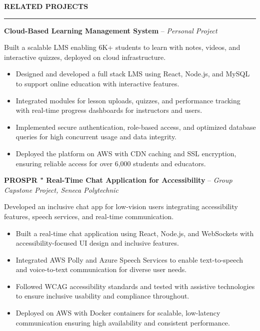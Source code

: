 \documentclass[10pt,letterpaper]{article}
\begin{document}
\vspace{6pt}

\textbf{RELATED PROJECTS}\\[-8pt]
\noindent\rule{\textwidth}{1pt}

\vspace{-2pt}

\textbf{Cloud-Based Learning Management System} -- \emph{Personal Project}

\vspace{-1pt}

Built a scalable LMS enabling 6K+ students to learn with notes, videos, and interactive quizzes, deployed on cloud infrastructure.
\vspace{-1pt}
\begin{itemize}
\item Designed and developed a full stack LMS using React, Node.js, and MySQL to support online education with interactive features.
\item Integrated modules for lesson uploads, quizzes, and performance tracking with real-time progress dashboards for instructors and users.
\item Implemented secure authentication, role-based access, and optimized database queries for high concurrent usage and data integrity.
\item Deployed the platform on AWS with CDN caching and SSL encryption, ensuring reliable access for over 6,000 students and educators.
\end{itemize}

\textbf{PROSPR " Real-Time Chat Application for Accessibility} -- \emph{Group Capstone Project, Seneca Polytechnic}

\vspace{-1pt}

Developed an inclusive chat app for low-vision users integrating accessibility features, speech services, and real-time communication.
\vspace{-1pt}
\begin{itemize}
\item Built a real-time chat application using React, Node.js, and WebSockets with accessibility-focused UI design and inclusive features.
\item Integrated AWS Polly and Azure Speech Services to enable text-to-speech and voice-to-text communication for diverse user needs.
\item Followed WCAG accessibility standards and tested with assistive technologies to ensure inclusive usability and compliance throughout.
\item Deployed on AWS with Docker containers for scalable, low-latency communication ensuring high availability and consistent performance.
\end{itemize}
\end{document}
